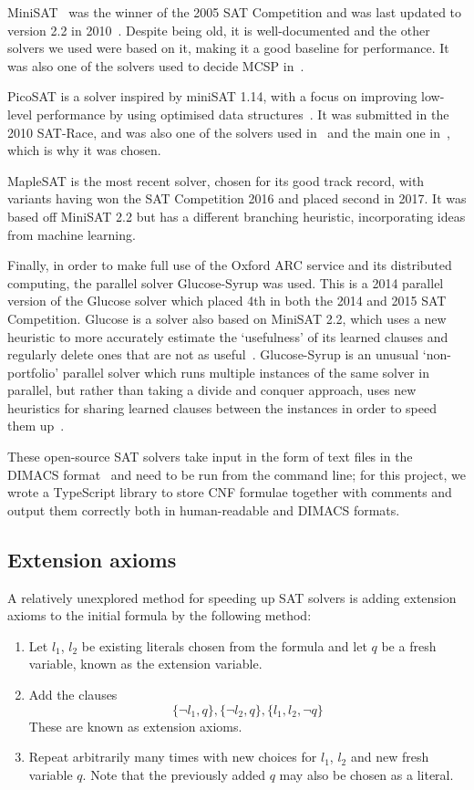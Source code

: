 \documentclass{article}
\begin{document}
MiniSAT~\cite{minisat} was the winner of the 2005 SAT Competition and was last updated to version 2.2 in 2010~\cite{minisat2010}. Despite being old, it is well-documented and the other solvers we used were based on it, making it a good baseline for performance. It was also one of the solvers used to decide MCSP in~\cite{kulikov}.

PicoSAT is a solver inspired by miniSAT 1.14, with a focus on improving low-level performance by using optimised data structures~\cite{picosat}. It was submitted in the 2010 SAT-Race, and was also one of the solvers used in~\cite{kulikov} and the main one in~\cite{kulikovlocal}, which is why it was chosen.

MapleSAT is the most recent solver, chosen for its good track record, with variants having won the SAT Competition 2016 and placed second in 2017. It was based off MiniSAT 2.2 but has a different branching heuristic, incorporating ideas from machine learning\cite{maplesat}.

Finally, in order to make full use of the Oxford ARC service and its distributed computing, the parallel solver Glucose-Syrup was used. This is a 2014 parallel version of the Glucose solver which placed 4th in both the 2014 and 2015 SAT Competition. Glucose is a solver also based on MiniSAT 2.2, which uses a new heuristic to more accurately estimate the `usefulness' of its learned clauses and regularly delete ones that are not as useful~\cite{glucose}. Glucose-Syrup is an unusual `non-portfolio' parallel solver which runs multiple instances of the same solver in parallel, but rather than taking a divide and conquer approach, uses new heuristics for sharing learned clauses between the instances in order to speed them up~\cite{glucose-syrup}.

These open-source SAT solvers take input in the form of text files in the DIMACS format~\cite{dimacs} and need to be run from the command line; for this project, we wrote a TypeScript library to store CNF formulae together with comments and output them correctly both in human-readable and DIMACS formats.

\subsection{Extension axioms}

A relatively unexplored method for speeding up SAT solvers is adding extension axioms to the initial formula by the following method:

\begin{enumerate}
  \item Let $l_1$, $l_2$ be existing literals chosen from the formula and let $q$ be a fresh variable, known as the extension variable.
  \item Add the clauses
  \[
    \{\neg l_1, q\}, \{\neg l_2, q\}, \{l_1, l_2, \neg q\}
  \]
  These are known as extension axioms.
  \item Repeat arbitrarily many times with new choices for $l_1$, $l_2$ and new fresh variable $q$. Note that the previously added $q$ may also be chosen as a literal.
\end{enumerate}
\end{document}
